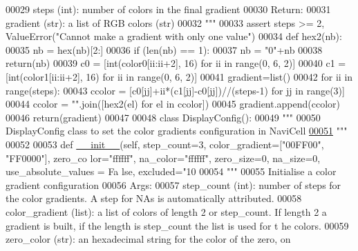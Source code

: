 \begin{DoxyCode}
00029 \textcolor{stringliteral}{        steps (int): number of colors in the final gradient}
00030 \textcolor{stringliteral}{    Return:}
00031 \textcolor{stringliteral}{        gradient (str): a list of RGB colors (str)}
00032 \textcolor{stringliteral}{    """}
00033     \textcolor{keyword}{assert} steps >= 2, ValueError(\textcolor{stringliteral}{"Cannot make a gradient with only one value"})
00034     \textcolor{keyword}{def }hex2(nb):
00035         nb = hex(nb)[2:]
00036         \textcolor{keywordflow}{if} (len(nb) == 1):
00037             nb = \textcolor{stringliteral}{"0"}+nb
00038         \textcolor{keywordflow}{return}(nb)
00039     c0 = [int(color0[ii:ii+2], 16) \textcolor{keywordflow}{for} ii \textcolor{keywordflow}{in} range(0, 6, 2)]
00040     c1 = [int(color1[ii:ii+2], 16) \textcolor{keywordflow}{for} ii \textcolor{keywordflow}{in} range(0, 6, 2)]
00041     gradient=list()
00042     \textcolor{keywordflow}{for} ii \textcolor{keywordflow}{in} range(steps):
00043         ccolor = [c0[jj]+ii*(c1[jj]-c0[jj])//(steps-1) \textcolor{keywordflow}{for} jj \textcolor{keywordflow}{in} range(3)]
00044         ccolor = \textcolor{stringliteral}{""}.join([hex2(el) \textcolor{keywordflow}{for} el \textcolor{keywordflow}{in} ccolor])
00045         gradient.append(ccolor)
00046     \textcolor{keywordflow}{return}(gradient)
00047 
00048 \textcolor{keyword}{class }DisplayConfig():
00049     \textcolor{stringliteral}{"""}
00050 \textcolor{stringliteral}{    DisplayConfig class to set the color gradients configuration in NaviCell}
\hypertarget{displayConfig_8py_source_l00051}{}\hyperlink{classnavicom_1_1displayConfig_1_1DisplayConfig}{00051} \textcolor{stringliteral}{    """}
00052 
00053     \textcolor{keyword}{def }\hyperlink{classnavicom_1_1displayConfig_1_1DisplayConfig_a26387ee9e6fe63612bc87a4d5d4a17f2}{__init__}(self, step\_count=3, color\_gradient=["00FF00", "FF0000"], zero\_co
      lor="ffffff", na\_color="ffffff", zero\_size=0, na\_size=0, use\_absolute\_values = Fa
      lse, excluded="10%
00054         \textcolor{stringliteral}{"""}
00055 \textcolor{stringliteral}{        Initialise a color gradient configuration}
00056 \textcolor{stringliteral}{        Args:}
00057 \textcolor{stringliteral}{            step\_count (int): number of steps for the color gradients. A step for
       NAs is automatically attributed.}
00058 \textcolor{stringliteral}{            color\_gradient (list): a list of colors of length 2 or step\_count. If
       length 2 a gradient is built, if the length is step\_count the list is used for t
      he colors.}
00059 \textcolor{stringliteral}{            zero\_color (str): an hexadecimal string for the color of the zero, on
}
\end{DoxyCode}
